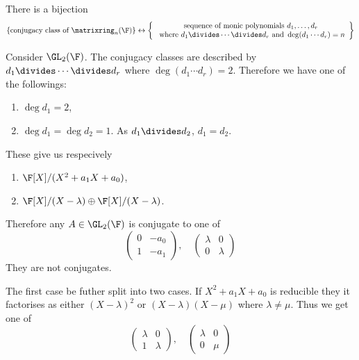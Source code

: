 \documentclass[a4paper]{article}
\theoremstyle{definition}
\begin{document}
\begin{corollary}
  There is a bijection
  \[
    \{\text{conjugacy class of } \matrixring_n(\F)\} \leftrightarrow
    \left\{
    \begin{array}[h]{c}
      \text{sequence of monic polynomials } d_1, \dots, d_r \\
      \text{ where } d_1 \divides \cdots \divides d_r \text{ and } \deg (d_1 \cdots d_r) = n
    \end{array}
  \right\}
  \]
\end{corollary}

\begin{eg}
  Consider \(\GL_2(\F)\). The conjugacy classes are described by \(d_1 \divides \cdots \divides d_r\) where \(\deg (d_1 \cdots d_r) = 2\). Therefore we have one of the followings:
  \begin{enumerate}
  \item \(\deg d_1 = 2\),
  \item \(\deg d_1 = \deg d_2 = 1\). As \(d_1 \divides d_2\), \(d_1 = d_2\).
  \end{enumerate}
  These give us respecively
  \begin{enumerate}
  \item \(\F[X]/(X^2 + a_1X + a_0)\),
  \item \(\F[X]/(X - \lambda) \oplus \F[X]/(X - \lambda)\).
  \end{enumerate}

  Therefore any \(A \in \GL_2(\F)\) is conjugate to one of
  \[
    \begin{pmatrix}
      0 & -a_0 \\
      1 & -a_1
    \end{pmatrix}
    ,\quad
    \begin{pmatrix}
      \lambda & 0 \\
      0 & \lambda
    \end{pmatrix}
  \]
  They are not conjugates.

  The first case be futher split into two cases. If \(X^2 + a_1X + a_0\) is reducible they it factorises as either \((X - \lambda)^2\) or \((X - \lambda)(X - \mu)\) where \(\lambda \neq \mu\). Thus we get one of
  \[
    \begin{pmatrix}
      \lambda & 0 \\
      1 & \lambda
    \end{pmatrix}
    ,\quad
    \begin{pmatrix}
      \lambda & 0 \\
      0 & \mu
    \end{pmatrix}
  \]
\end{eg}
\end{document}
